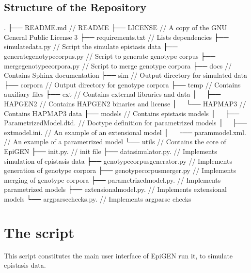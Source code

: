 \documentclass[a4paper,10pt,english]{sphinxhowto}
\begin{document}
\subsection{Structure of the Repository}
\label{\detokenize{README:structure-of-the-repository}}
\begin{sphinxVerbatim}[commandchars=\\\{\}]
.
├── README.md                        // README
├── LICENSE                          // A copy of the GNU General Public License 3
├── requirements.txt                 // Lists dependencies
├── simulate\PYGZus{}data.py                 // Script the simulate epistasis data
├── generate\PYGZus{}genotype\PYGZus{}corpus.py      // Script to generate genotype corpus
├── merge\PYGZus{}genotype\PYGZus{}corpora.py        // Script to merge genotype corpora
├── docs                             // Contains Sphinx documentation
├── sim                              // Output directory for simulated data
├── corpora                          // Output directory for genotype corpora
├── temp                             // Contains auxiliary files 
├── ext                              // Contains external libraries and data
│   ├── HAPGEN2                      // Contains HAPGEN2 binaries and license
│   └── HAPMAP3                      // Contains HAPMAP3 data
├── models                           // Contains epistasis models
│   ├── ParametrizedModel.dtd.       // Doctype definition for parametrized models
│   ├── ext\PYGZus{}model.ini.               // An example of an extensional model
│   └── param\PYGZus{}model.xml.             // An example of a parametrized model
└── utils                            // Contains the core of EpiGEN
    ├── \PYGZus{}\PYGZus{}init\PYGZus{}\PYGZus{}.py.                 // \PYGZus{}\PYGZus{}init\PYGZus{}\PYGZus{} file
    ├── data\PYGZus{}simulator.py.           // Implements simulation of epistasis data
    ├── genotype\PYGZus{}corpus\PYGZus{}generator.py // Implements generation of genotype corpora
    ├── genotype\PYGZus{}corpusmerger.py     // Implements merging of genotype corpora
    ├── parametrized\PYGZus{}model.py.       // Implements parametrized models 
    ├── extensional\PYGZus{}model.py.        // Implements extensional models
    └── argparse\PYGZus{}checks.py.          // Implements argparse checks
\end{sphinxVerbatim}


\section{The script }
\label{\detokenize{simulate_data:module-simulate_data}}\label{\detokenize{simulate_data:the-script-simulate-data-py}}\label{\detokenize{simulate_data::doc}}
This script constitutes the main user interface of EpiGEN \textendash{} run it, to simulate epistasis data.
\end{document}
